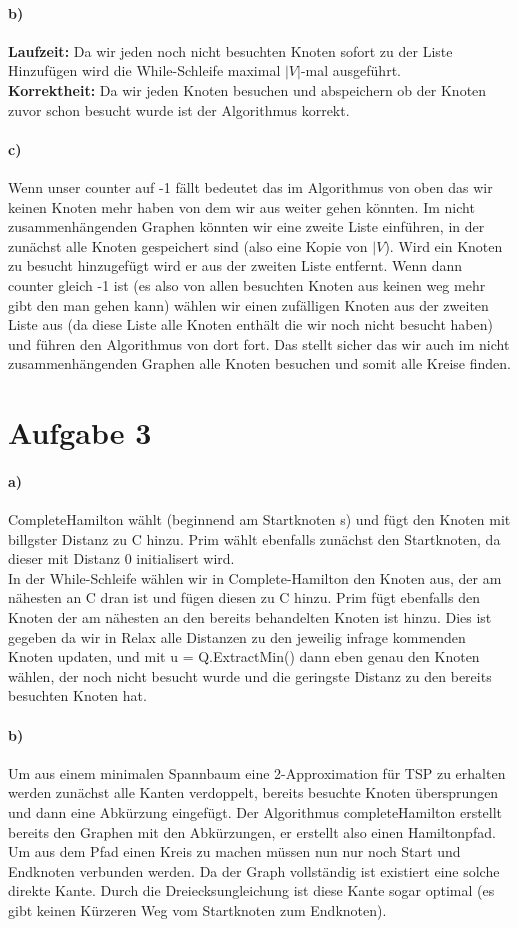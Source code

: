 \documentclass[a4paper]{article}
\begin{document}
\paragraph{b)}
\textbf{Laufzeit:} Da wir jeden noch nicht besuchten Knoten sofort zu der Liste 
Hinzufügen wird die While-Schleife maximal $|V|$-mal ausgeführt. \\
\textbf{Korrektheit:} Da wir jeden Knoten besuchen und abspeichern ob der Knoten
zuvor schon besucht wurde ist der Algorithmus korrekt.
\paragraph{c)}
Wenn unser counter auf -1 fällt bedeutet das im Algorithmus von oben das 
wir keinen Knoten mehr haben von dem wir aus weiter gehen könnten. 
Im nicht zusammenhängenden Graphen könnten wir eine zweite Liste einführen, 
in der zunächst alle Knoten gespeichert sind (also eine Kopie von $|V$). Wird 
ein Knoten zu besucht hinzugefügt wird er aus der zweiten Liste entfernt. 
Wenn dann counter gleich -1 ist (es also von allen besuchten Knoten aus
keinen weg mehr gibt den man gehen kann) wählen wir einen zufälligen Knoten
aus der zweiten Liste aus (da diese Liste alle Knoten enthält die wir noch 
nicht besucht haben) und führen den Algorithmus von dort fort. Das stellt 
sicher das wir auch im nicht zusammenhängenden Graphen alle Knoten besuchen 
und somit alle Kreise finden.
\section{Aufgabe 3}
\paragraph{a)}
CompleteHamilton wählt (beginnend am Startknoten s) und fügt den Knoten mit 
billgster Distanz zu C hinzu. Prim wählt ebenfalls zunächst den Startknoten, 
da dieser mit Distanz 0 initialisert wird. \\
In der While-Schleife wählen wir in Complete-Hamilton den Knoten aus, der 
am nähesten an C dran ist und fügen diesen zu C hinzu. Prim fügt ebenfalls 
den Knoten der am nähesten an den bereits behandelten Knoten ist hinzu.
Dies ist gegeben da wir in Relax alle Distanzen zu den jeweilig infrage 
kommenden Knoten updaten, und mit u = Q.ExtractMin() dann eben genau 
den Knoten wählen, der noch nicht besucht wurde und die geringste 
Distanz zu den bereits besuchten Knoten hat.
\paragraph{b)}
Um aus einem minimalen Spannbaum eine 2-Approximation für TSP zu 
erhalten werden zunächst alle Kanten verdoppelt, bereits besuchte 
Knoten übersprungen und dann eine Abkürzung eingefügt. Der Algorithmus
completeHamilton erstellt bereits den Graphen mit den Abkürzungen, er
erstellt also einen Hamiltonpfad. Um aus dem Pfad einen Kreis zu machen
müssen nun nur noch Start und Endknoten verbunden werden. Da der Graph
vollständig ist existiert eine solche direkte Kante. Durch die 
Dreiecksungleichung ist diese Kante sogar optimal (es gibt keinen
Kürzeren Weg vom Startknoten zum Endknoten). 
\end{document}
